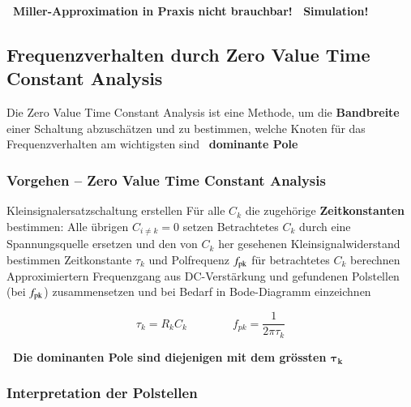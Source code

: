 \smallskip

\textbf{ \textrightarrow\ Miller-Approximation in Praxis nicht brauchbar! \textrightarrow\ Simulation! }



\subsection{Frequenzverhalten durch Zero Value Time Constant Analysis}

Die Zero Value Time Constant Analysis ist eine Methode, um die \textbf{Bandbreite} einer Schaltung abzuschätzen und zu bestimmen, welche Knoten für das Frequenzverhalten am wichtigsten sind \textrightarrow\ \textbf{dominante Pole}


\subsubsection{Vorgehen -- Zero Value Time Constant Analysis}

{
\renewcommand{\outlinei}{enumerate}
\renewcommand{\outlineii}{enumerate}
\begin{outline}
    \1 Kleinsignalersatzschaltung erstellen
    \1 Für alle $C_k$ die zugehörige \textbf{Zeitkonstanten} bestimmen:
        \2 Alle übrigen $C_{i \neq k} = 0$ setzen
        \2 Betrachtetes $C_k$ durch eine Spannungsquelle ersetzen und den von $C_k$ her gesehenen Kleinsignalwiderstand bestimmen
        \2 Zeitkonstante $\tau_k$ und Polfrequenz $f_{\rm pk}$ für betrachtetes $C_k$ berechnen
    \1 Approximiertern Frequenzgang aus DC-Verstärkung und gefundenen Polstellen \\
        (bei $f_{\rm pk}$) zusammensetzen und bei Bedarf in Bode-Diagramm einzeichnen
\end{outline}
}

$$ \tau_k = R_k C_k \qquad \qquad f_{pk} = \frac{1}{2 \pi \tau_k} $$

\textbf{ \textrightarrow\ Die dominanten Pole sind diejenigen mit dem grössten $\bm{\tau_k}$}


\subsubsection{Interpretation der Polstellen}

